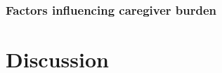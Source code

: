 \documentclass[12pt]{article}
\begin{document}
\subsubsection{Factors influencing caregiver burden}

\section{Discussion}

\clearpage
\newrefcontext[sorting=nyt]
\printbibliography
\end{document}
